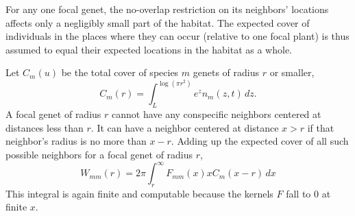 \documentclass[11pt]{article}
\begin{document}
For any one focal genet, the no-overlap restriction on its neighbors' locations affects 
only a negligibly small part of the habitat. The expected cover of individuals in the places
where they can occur (relative to one focal plant) is thus assumed to equal their expected locations
in the habitat as a whole. 
 
Let $C_m(u)$ be the total cover of species $m$ genets of radius $r$ or smaller, 
\begin{equation}
C_m(r) = \int_L^{\log(\pi r^2)}{\! \! \! e^z n_m(z,t) \, dz} .
\label{eqn:cm}
\end{equation}
A focal genet of radius $r$ cannot have any conspecific neighbors centered 
at distances less than $r$. It can have a neighbor centered at distance $x>r$ if that neighbor's
radius is no more than $x-r$. Adding up the expected cover of all such possible neighbors
for a focal genet of radius $r$,    
\begin{equation}
W_{mm}(r) = 2 \pi \int_r^{\infty}F_{mm}(x) x C_m(x-r) \, dx
\label{eqn:wbarmr} 
\end{equation}
This integral is again finite and computable because the kernels $F$ fall to 0 at finite $x$. 

\clearpage 
\newpage  
\end{document}
